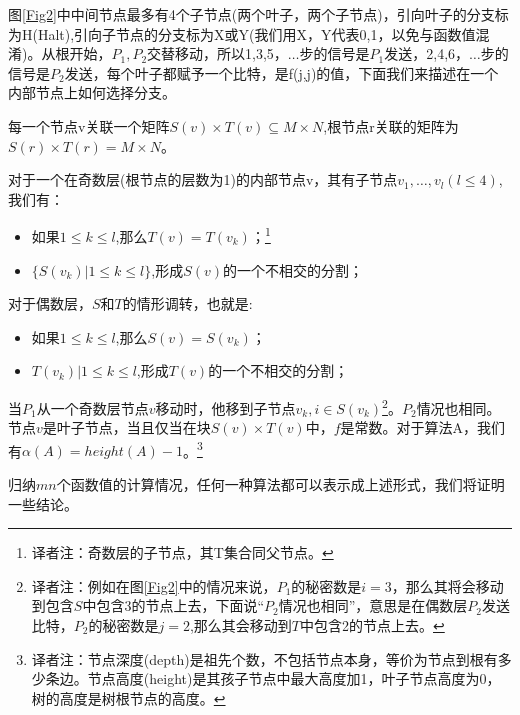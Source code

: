 \documentclass[]{article}
\begin{document}
	图\ref{Fig2}中中间节点最多有4个子节点(两个叶子，两个子节点)，引向叶子的分支标为H(Halt),引向子节点的分支标为X或Y(我们用X，Y代表0,1，以免与函数值混淆)。从根开始，$P_1,P_2$交替移动，所以1,3,5，$\ldots$步的信号是$P_1$发送，2,4,6，$\ldots$步的信号是$P_2$发送，每个叶子都赋予一个比特，是f(j,j)的值，下面我们来描述在一个内部节点上如何选择分支。\par
	
	每一个节点v关联一个矩阵$S(v)\times T(v)\subseteq M\times N$,根节点r关联的矩阵为$S(r)\times T(r)= M\times N$。\par
	对于一个在奇数层(根节点的层数为1)的内部节点v，其有子节点$v_1,\ldots,v_l(l\leq 4)$,我们有：
	\begin{itemize}
		\item 如果$1\leq k \leq l $,那么$T(v)=T(v_k)$；\footnote{译者注：奇数层的子节点，其T集合同父节点。}
		\item $\{S(v_k) | 1\leq k \leq l\}$,形成$S(v)$的一个不相交的分割；
	\end{itemize}
	\par
	
	对于偶数层，$S$和$T$的情形调转，也就是:
	\begin{itemize}
		\item 如果$1\leq k \leq l $,那么$S(v)=S(v_k)$；
		\item $T(v_k) | 1\leq k \leq l$,形成$T(v)$的一个不相交的分割；
	\end{itemize}
	\par
	
	当$P_1$从一个奇数层节点$v$移动时，他移到子节点$v_k,i\in S(v_k)$\footnote{译者注：例如在图\ref{Fig2}中的情况来说，$P_1$的秘密数是$i=3$，那么其将会移动到包含$S$中包含3的节点上去，下面说“$P_2$情况也相同”，意思是在偶数层$P_2$发送比特，$P_2$的秘密数是$j=2$,那么其会移动到$T$中包含2的节点上去。}。$P_2$情况也相同。节点$v$是叶子节点，当且仅当在块$S(v)\times T(v)$中，$f$是常数。对于算法A，我们有$\alpha (A)=height(A)-1$。\footnote{译者注：节点深度(depth)是祖先个数，不包括节点本身，等价为节点到根有多少条边。节点高度(height)是其孩子节点中最大高度加1，叶子节点高度为0，树的高度是树根节点的高度。}
	\par
	归纳$mn$个函数值的计算情况，任何一种算法都可以表示成上述形式，我们将证明一些结论。
	\par
	
\end{document}
